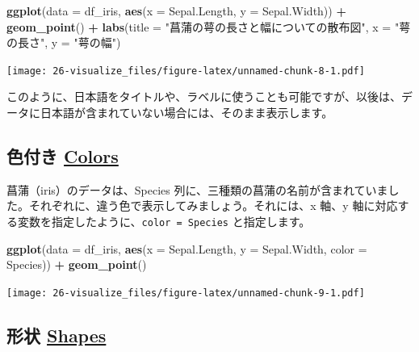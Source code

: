\documentclass[
  xelatex, ja=standard]{bxjsbook}
\newenvironment{Shaded}{\begin{snugshade}}{\end{snugshade}}
\newcommand{\AttributeTok}[1]{\textcolor[rgb]{0.13,0.29,0.53}{#1}}
\newcommand{\FunctionTok}[1]{\textcolor[rgb]{0.13,0.29,0.53}{\textbf{#1}}}
\newcommand{\NormalTok}[1]{#1}
\newcommand{\SpecialCharTok}[1]{\textcolor[rgb]{0.81,0.36,0.00}{\textbf{#1}}}
\newcommand{\StringTok}[1]{\textcolor[rgb]{0.31,0.60,0.02}{#1}}
\theoremstyle{definition}
\theoremstyle{definition}
\theoremstyle{definition}
\theoremstyle{definition}
\theoremstyle{remark}
\begin{document}
\begin{Shaded}
\begin{Highlighting}[]
\FunctionTok{ggplot}\NormalTok{(}\AttributeTok{data =}\NormalTok{ df\_iris, }\FunctionTok{aes}\NormalTok{(}\AttributeTok{x =}\NormalTok{ Sepal.Length, }\AttributeTok{y =}\NormalTok{ Sepal.Width)) }\SpecialCharTok{+}
  \FunctionTok{geom\_point}\NormalTok{() }\SpecialCharTok{+} 
  \FunctionTok{labs}\NormalTok{(}\AttributeTok{title =} \StringTok{"菖蒲の萼の長さと幅についての散布図"}\NormalTok{, }\AttributeTok{x =} \StringTok{"萼の長さ"}\NormalTok{, }\AttributeTok{y =} \StringTok{"萼の幅"}\NormalTok{)}
\end{Highlighting}
\end{Shaded}

\texttt{[image: 26-visualize\_files/figure-latex/unnamed-chunk-8-1.pdf]}

このように、日本語をタイトルや、ラベルに使うことも可能ですが、以後は、データに日本語が含まれていない場合には、そのまま表示します。

\hypertarget{ux8272ux4ed8ux304d-colors}{%
\subsection{\texorpdfstring{色付き \href{https://ggplot2.tidyverse.org/reference/aes_colour_fill_alpha.html}{Colors}}{色付き Colors}}\label{ux8272ux4ed8ux304d-colors}}

菖蒲（iris）のデータは、Species 列に、三種類の菖蒲の名前が含まれていました。それぞれに、違う色で表示してみましょう。それには、x 軸、y 軸に対応する変数を指定したように、\texttt{color\ =\ Species} と指定します。

\begin{Shaded}
\begin{Highlighting}[]
\FunctionTok{ggplot}\NormalTok{(}\AttributeTok{data =}\NormalTok{ df\_iris, }\FunctionTok{aes}\NormalTok{(}\AttributeTok{x =}\NormalTok{ Sepal.Length, }\AttributeTok{y =}\NormalTok{ Sepal.Width, }\AttributeTok{color =}\NormalTok{ Species)) }\SpecialCharTok{+}
  \FunctionTok{geom\_point}\NormalTok{()}
\end{Highlighting}
\end{Shaded}

\texttt{[image: 26-visualize\_files/figure-latex/unnamed-chunk-9-1.pdf]}

\hypertarget{ux5f62ux72b6-shapes}{%
\subsection{\texorpdfstring{形状 \href{https://ggplot2.tidyverse.org/articles/ggplot2-specs.html}{Shapes}}{形状 Shapes}}\label{ux5f62ux72b6-shapes}}
\end{document}
